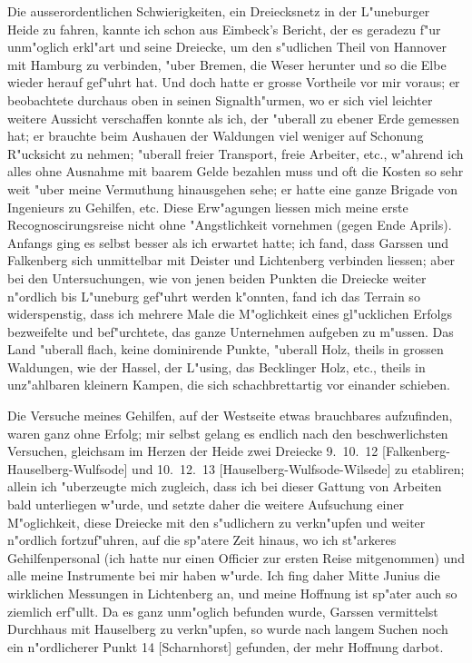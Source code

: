 \documentclass[12pt,a4paper]{article}
\theoremstyle{plain}
\theoremstyle{definition}
\theoremstyle{remark}
\begin{document}
\medskip
\noindent Die ausserordentlichen Schwierigkeiten, ein Dreiecksnetz in der L"uneburger Heide zu fahren, kannte ich schon aus Eimbeck's Bericht, der es geradezu f"ur unm"oglich erkl"art und seine Dreiecke, um den s"udlichen Theil von Hannover mit Hamburg zu verbinden, "uber Bremen, die Weser herunter und so die Elbe wieder herauf gef"uhrt hat. Und doch hatte er grosse Vortheile vor mir voraus; er beobachtete durchaus oben in seinen Signalth"urmen, wo er sich viel leichter weitere Aussicht verschaffen konnte als ich, der "uberall zu ebener Erde gemessen hat; er brauchte beim Aushauen der Waldungen viel weniger auf Schonung R"ucksicht zu nehmen; "uberall freier Transport, freie Arbeiter, etc., w"ahrend ich alles ohne Ausnahme mit baarem Gelde bezahlen muss und oft die Kosten so sehr weit "uber meine Vermuthung hinausgehen sehe; er hatte eine ganze Brigade von Ingenieurs zu Gehilfen, etc. Diese Erw"agungen liessen mich meine erste Recognoscirungsreise nicht ohne "Angstlichkeit vornehmen (gegen Ende Aprils). Anfangs ging es selbst besser als ich erwartet hatte; ich fand, dass Garssen und Falkenberg sich unmittelbar mit Deister und Lichtenberg verbinden liessen; aber bei den Untersuchungen, wie von jenen beiden Punkten die Dreiecke weiter n"ordlich bis L"uneburg gef"uhrt werden k"onnten, fand ich das Terrain so widerspenstig, dass ich mehrere Male die M"oglichkeit eines gl"ucklichen Erfolgs bezweifelte und bef"urchtete, das ganze Unternehmen aufgeben zu m"ussen. Das Land "uberall flach, keine dominirende Punkte, "uberall Holz, theils in grossen Waldungen, wie der Hassel, der L"using, das Becklinger Holz, etc., theils in unz"ahlbaren kleinern Kampen, die sich schachbrettartig vor einander schieben.

\newpage
\noindent Die Versuche meines Gehilfen, auf der Westseite etwas brauchbares aufzufinden, waren ganz ohne Erfolg; mir selbst gelang es endlich nach den beschwerlichsten Versuchen, gleichsam im Herzen der Heide zwei Dreiecke 9.~10.~12 [Falkenberg-Hauselberg-Wulfsode] und 10.~12.~13 [Hauselberg-Wulfsode-Wilsede] zu etabliren; allein ich "uberzeugte mich zugleich, dass ich bei dieser Gattung von Arbeiten bald unterliegen w"urde, und setzte daher die weitere Aufsuchung einer M"oglichkeit, diese Dreiecke mit den s"udlichern zu verkn"upfen und weiter n"ordlich fortzuf"uhren, auf die sp"atere Zeit hinaus, wo ich st"arkeres Gehilfenpersonal (ich hatte nur einen Officier zur ersten Reise mitgenommen) und alle meine Instrumente bei mir haben w"urde. Ich fing daher Mitte Junius die wirklichen Messungen in Lichtenberg an, und meine Hoffnung ist sp"ater auch so ziemlich erf"ullt. Da es ganz unm"oglich befunden wurde, Garssen vermittelst Durchhaus mit Hauselberg zu verkn"upfen, so wurde nach langem Suchen noch ein n"ordlicherer Punkt 14 [Scharnhorst] gefunden, der mehr Hoffnung darbot.
\end{document}
